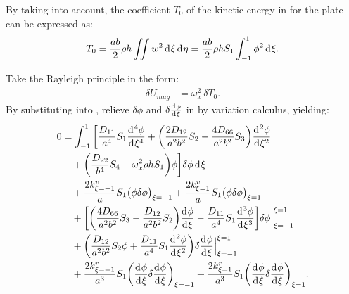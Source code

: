 \documentclass[preprint,12pt]{elsarticle}
\newcommand{\id}{\mathrm{d}\mkern1mu}
\begin{document}
%
By taking  into account, the coefficient \(T_0\) of the kinetic energy in  for the plate can be expressed as:
%
\begin{equation}\label{eq:kine_energyx}
	\begin{split}
		T_0 = \frac{ab}{2}\rho h\iint w^2 \, \id \xi \, \id \eta = \frac{ab}{2}\rho h S_1\int_{-1}^{1} \phi^2 \, \id \xi.
	\end{split}
\end{equation}

Take the Rayleigh principle in the form:
%
\begin{equation}\label{eq:Rayleighx}
	\begin{split}
		\delta U_{mag} &= \omega_x^2 \, \delta T_0.
	\end{split}
\end{equation}
%
By substituting  into , relieve \(\delta \phi\) and \(\delta\frac{\id  \phi}{\id \xi}\) in  by variation calculus, yielding:
%
\begin{equation}\label{eq:Rayleighx2}
	\begin{split}
		0 &= \int_{-1}^{1} \bigg[ \frac{D_{11}}{a^4} S_1 \frac{\id^4 \phi}{\id \xi^4} 
		+ \bigg( \frac{2D_{12}}{a^2b^2} S_2 - \frac{4D_{66}}{a^2b^2} S_3 \bigg) \frac{\id^2 \phi}{\id \xi^2} \\
		&\quad + \bigg( \frac{D_{22}}{b^4} S_4 - \omega_x^2 \rho h S_1 \bigg) \phi \bigg] \delta \phi \, \id \xi \\
		&\quad + \frac{2k^v_{\xi=-1}}{a} S_1 \big(\phi \delta \phi\big)_{\xi=-1} 
		+ \frac{2k^v_{\xi=1}}{a} S_1 \big(\phi \delta \phi\big)_{\xi=1} \\
		&\quad + \bigg[ \bigg( \frac{4D_{66}}{a^2b^2} S_3 - \frac{D_{12}}{a^2b^2} S_2 \bigg) \frac{\id \phi}{\id \xi} 
		- \frac{D_{11}}{a^4} S_1 \frac{\id^3 \phi}{\id \xi^3} \bigg] \delta \phi \Big|^{\xi=1}_{\xi=-1} \\
		&\quad + \bigg( \frac{D_{12}}{a^2b^2} S_2 \phi + \frac{D_{11}}{a^4} S_1 \frac{\id^2 \phi}{\id \xi^2} \bigg) 
		\delta\frac{\id  \phi}{\id \xi} \Big|^{\xi=1}_{\xi=-1} \\
		&\quad + \frac{2k^r_{\xi=-1}}{a^3} S_1 \bigg(\frac{\id \phi}{\id \xi}\delta \frac{\id \phi}{\id \xi}\bigg)_{\xi=-1} 
		+ \frac{2k^r_{\xi=1}}{a^3} S_1 \bigg(\frac{\id \phi}{\id \xi} \delta\frac{\id \phi}{\id \xi}\bigg)_{\xi=1}.
	\end{split}
\end{equation}
%
\end{document}
